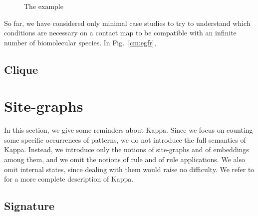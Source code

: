 \documentclass{entcs}
\begin{document}
\begin{figure}[t]
\caption{The example }
 \end{figure}

So far, we have considered only minimal case studies to try to understand which conditions are necessary on a contact map to be compatible with an infinite number of biomolecular species. In Fig.~\ref{cm:egfr},


\subsection{Clique}













\section{Site-graphs}

\label{sec:kappa}

In this section, we give some reminders about Kappa.
Since we focus on counting some specific occurrences of patterns, we do not introduce the full semantics of Kappa. Instead, we introduce only the notions of site-graphs and of embeddings among them, and we omit the notions of rule and of rule applications. We also omit internal states, since dealing with them would raise no difficulty.  We refer to
\cite{DBLP:journals/tcs/DanosL04,Feret_IJSI2013} for a more complete description of Kappa.

\subsection{Signature}
\end{document}

